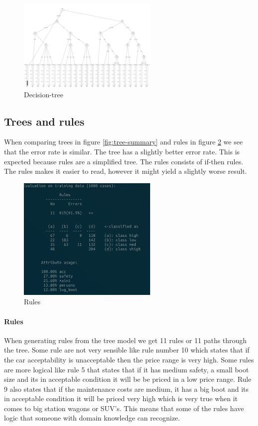 \documentclass[a4paper, 12pt]{article}
\begin{document}
  \begin{figure}[h]
    \centering 
    \includegraphics[width=0.6\textwidth]
    {images/tree}
    \caption{Decision-tree}
    \label{fig:decition-tree}
  \end{figure}
  \subsection{Trees and rules}
  When comparing trees in figure \ref{fig:tree-summary} and rules in figure \ref{fig:rules} we see that the error rate is similar. The tree has a slightly better error rate. This is expected because rules are a simplified tree. The rules consists of if-then rules. The rules makes it easier to read, however it might yield a slightly worse result.
  \begin{figure}[h]
    \centering 
    \includegraphics[width=0.6\textwidth]
    {images/summary-rules}
    \caption{Rules}
    \label{fig:rules}
  \end{figure}

  \paragraph{Rules}
  When generating rules from the tree model we get 11 rules or 11 paths through the tree. Some rule are not very sensible like rule number 10 which states that if the car acceptability is unacceptable then the price range is very high. Some rules are more logical like rule 5 that states that if it has medium safety, a small boot size and its in acceptable condition it will be be priced in a low price range.
  Rule 9 also states that if the maintenance costs are medium, it has a big boot and its in acceptable condition it will be priced very high which is very true when it comes to big station wagons or SUV's. This means that some of the rules have logic that someone with domain knowledge can recognize.
\end{document}
